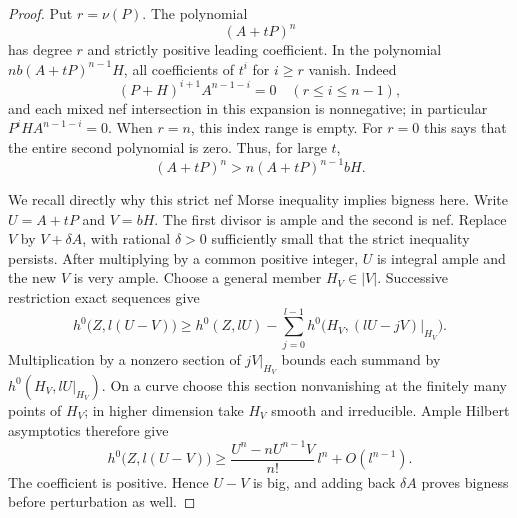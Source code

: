 \begin{proof}
Put $r=\nu(P)$.  The polynomial
\[
                      (A+tP)^n
\]
has degree $r$ and strictly positive leading coefficient.  In the
polynomial $n b(A+tP)^{n-1}H$, all coefficients of $t^i$ for $i\ge r$
vanish.  Indeed
\[
 (P+H)^{i+1}A^{n-1-i}=0\quad(r\le i\le n-1),
\]
and each mixed nef intersection in this expansion is nonnegative;
in particular $P^iHA^{n-1-i}=0$.  When $r=n$, this index range is empty.
For $r=0$ this says that the entire
second polynomial is zero.  Thus, for large $t$,
\begin{equation}\label{eq:nonvanishing-morse}
                   (A+tP)^n>n(A+tP)^{n-1}bH.
\end{equation}

We recall directly why this strict nef Morse inequality implies
bigness here.  Write $U=A+tP$ and $V=bH$.  The first divisor is ample
and the second is nef.  Replace $V$ by $V+\delta A$, with rational
$\delta>0$ sufficiently small that the strict inequality persists.
After multiplying by a common positive integer, $U$ is integral ample
and the new $V$ is very ample.  Choose a general member $H_V\in|V|$.
Successive restriction exact sequences give
\[
 h^0\bigl(Z,l(U-V)\bigr)
   \ge h^0(Z,lU)
      -\sum_{j=0}^{l-1}
             h^0\bigl(H_V,(lU-jV)|_{H_V}\bigr).
\]
Multiplication by a nonzero section of $jV|_{H_V}$ bounds each
summand by $h^0(H_V,lU|_{H_V})$.  On a curve choose this section
nonvanishing at the finitely many points of $H_V$; in higher dimension
take $H_V$ smooth and irreducible.  Ample Hilbert asymptotics therefore
give
\[
 h^0\bigl(Z,l(U-V)\bigr)
 \ge\frac{U^n-nU^{n-1}V}{n!}\,l^n+O(l^{n-1}).
\]
The coefficient is positive.  Hence $U-V$ is big, and adding back
$\delta A$ proves bigness before perturbation as well.
\end{proof}

